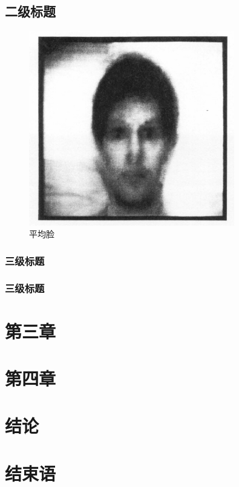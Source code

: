 \documentclass{csuthesis-article}
\begin{document}
\subsection{二级标题}

\begin{figure}[!h]
\centering
\includegraphics[angle=0,width=0.8\textwidth]{figures/averageFace.eps}
\caption{平均脸}
\end{figure}

\subsubsection{三级标题}
\subsubsection{三级标题}

\newpage
\section{第三章}

\newpage
\section{第四章}

\newpage
\section{结论}

\newpage
\section{结束语}
\end{document}

